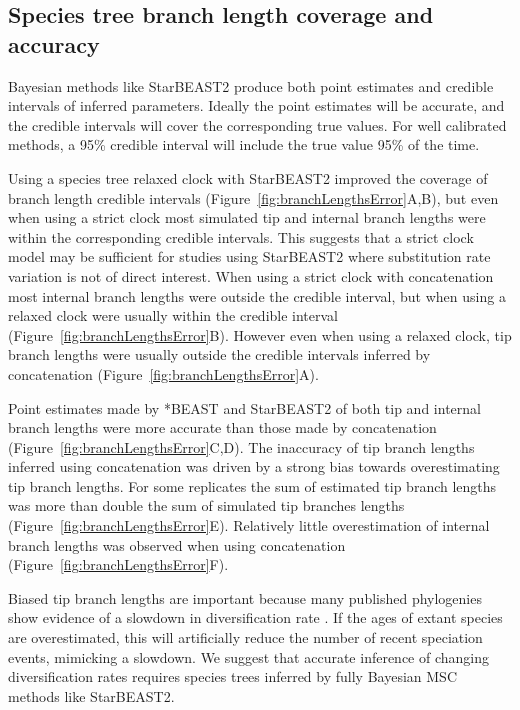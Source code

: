 \documentclass[12pt]{article}
\begin{document}
\subsection{Species tree branch length coverage and accuracy}

Bayesian methods like StarBEAST2 produce both point estimates and credible
intervals of inferred parameters. Ideally the point estimates will be
accurate, and the credible intervals will cover the corresponding true
values. For well calibrated methods, a 95\% credible interval will include
the true value 95\% of the time.

Using a species tree relaxed clock with StarBEAST2 improved the coverage of
branch length credible intervals (Figure~\ref{fig:branchLengthsError}A,B), but
even when using a strict clock most simulated tip and internal branch lengths
were within the corresponding credible intervals. This suggests that a strict
clock model may be sufficient for studies using StarBEAST2 where substitution
rate variation is not of direct interest. When using a strict clock with
concatenation most internal branch lengths were outside the credible interval,
but when using a relaxed clock were usually within the credible interval
(Figure~\ref{fig:branchLengthsError}B). However even when using a relaxed
clock, tip branch lengths were usually outside the credible intervals inferred
by concatenation (Figure~\ref{fig:branchLengthsError}A).

Point estimates made by *BEAST and StarBEAST2 of both tip and internal branch
lengths were more accurate than those made by concatenation
(Figure~\ref{fig:branchLengthsError}C,D). The inaccuracy of tip branch lengths
inferred using concatenation was driven by a strong bias towards
overestimating tip branch lengths. For some replicates the sum of estimated tip
branch lengths was more than double the sum of simulated tip branches lengths
(Figure~\ref{fig:branchLengthsError}E). Relatively little overestimation of
internal branch lengths was observed when using concatenation
(Figure~\ref{fig:branchLengthsError}F).

Biased tip branch lengths are important because many published phylogenies show
evidence of a slowdown in diversification rate \citep{Moen2014190}. If the
ages of extant species are overestimated, this will artificially reduce the
number of recent speciation events, mimicking a slowdown. We suggest that
accurate inference of changing diversification rates requires species trees
inferred by fully Bayesian MSC methods like StarBEAST2.
\end{document}
